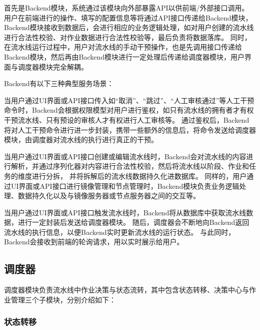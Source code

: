 首先是Backend模块，系统通过该模块向外部暴露API以供前端/外部接口调用。
用户在前端进行的操作、填写的配置信息等将通过API接口传递给Backend模块，Backend模块接收到数据后，会进行相应的业务逻辑处理，如对用户创建的流水线进行合法性校验、对作业数据进行合法性校验等，最后负责将数据落库。
同时，在流水线运行过程中，用户对流水线的手动干预操作，也是先调用接口传递给Backend模块，然后再由Backend模块进行一定处理后传递给调度器模块，用户界面与调度器模块完全解耦。

Backend有以下三种典型服务场景：

当用户通过UI界面或API接口传入如“取消”、“跳过”、“人工审核通过”等人工干预命令时，Backend会根据权限模型对用户进行鉴权，如只有流水线的拥有者才有权干预流水线、只有预设的审核人才有权进行人工审核等。
通过鉴权后，Backend将对人工干预命令进行进一步封装，携带一些额外的信息后，将命令发送给调度器模块，由调度器对流水线的执行进行真正的干预。

当用户通过UI界面或API接口创建或编辑流水线时，Backend会对流水线的内容进行解析，并通过序列化器对内容进行合法性校验，然后将流水线以阶段、作业和任务的维度进行分拆，
并将拆解后的流水线数据持久化进数据库。
同样的，用户通过UI界面或API接口进行镜像管理和节点管理时，Backend模块负责业务逻辑处理、数据持久化以及与镜像服务器或节点服务器之间的交互等。

当用户通过UI界面或API接口触发流水线时，Backend将从数据库中获取流水线数据，进行一定封装后发送给调度器模块。
随后，调度器会不断地向Backend返回流水线的执行信息，以便Backend实时更新流水线的运行状态。
与此同时，Backend会接收到前端的轮询请求，用以实时展示给用户。

\subsection{调度器}

调度器模块负责流水线中作业决策与状态流转，其中包含状态转移、决策中心与作业管理三个子模块，分别介绍如下：

\subsubsection{状态转移}

